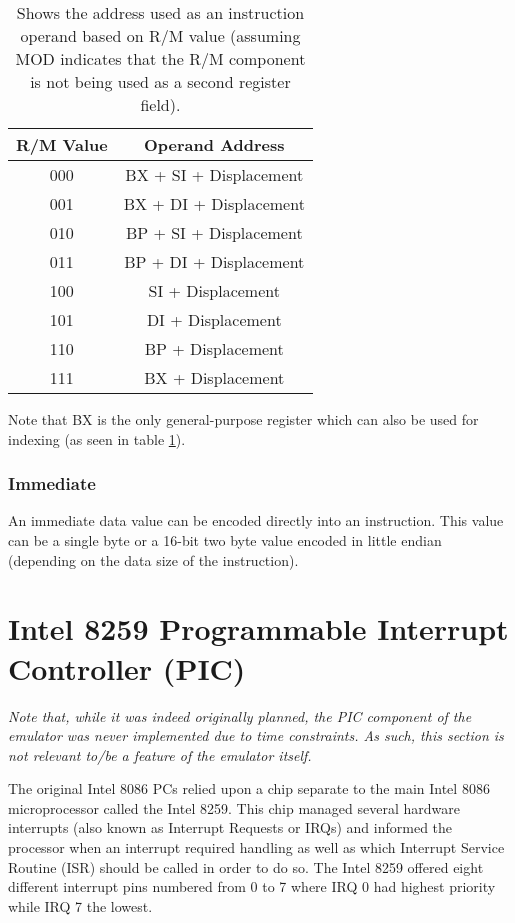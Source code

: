         \begin{table}[h]
            \centering
            \begin{tabular} { | c | c | }
                \hline
                R/M Value & Operand Address \\
                \hline
                000 & BX + SI + Displacement \\
                001 & BX + DI + Displacement \\
                010 & BP + SI + Displacement \\
                011 & BP + DI + Displacement \\
                100 & SI + Displacement \\
                101 & DI + Displacement \\
                110 & BP + Displacement \\
                111 & BX + Displacement \\
                \hline
            \end{tabular}
            \caption{Shows the address used as an instruction operand based on R/M value (assuming MOD indicates that the R/M component is not being used as a second register field).}
            \label{table:rm-values}
        \end{table}

        Note that BX is the only general-purpose register which can also be used for indexing (as seen in table \ref{table:rm-values}).

    \subsubsection{Immediate}
        An immediate data value can be encoded directly into an instruction. This value can be a single byte or a 16-bit two byte value encoded in little endian (depending on the data size of the instruction).

\section{Intel 8259 Programmable Interrupt Controller (PIC)}
    \textit{Note that, while it was indeed originally planned, the PIC component of the emulator was never implemented due to time constraints. As such, this section is not relevant to/be a feature of the emulator itself.}

    The original Intel 8086 PCs relied upon a chip separate to the main Intel 8086 microprocessor called the Intel 8259. This chip managed several hardware interrupts (also known as Interrupt Requests or IRQs) and informed the processor when an interrupt required handling as well as which Interrupt Service Routine (ISR) should be called in order to do so. The Intel 8259 offered eight different interrupt pins numbered from 0 to 7 where IRQ 0 had highest priority while IRQ 7 the lowest.

